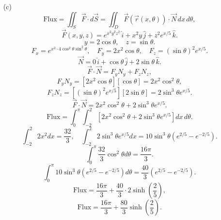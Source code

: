 \documentclass{report}
\begin{document}
{\begin{enumerate}
        \item[(c)]
        \[
        \text{Flux} = \iint_S \vec{F} \cdot d\vec{S} = \iint_D \vec{F}(\vec{r}(x, \theta)) \cdot \vec{N} \, dx \, d\theta,
        \]
        \[
        \vec{F}(x, y, z) = e^{x^2 y^2 z^2}\,\hat{i} + x^2 y\,\hat{j} + z^2 e^{x/5}\,\hat{k}.
        \]
        \[
        y = 2\cos \theta, \quad z = \sin \theta.
        \]
        \[
        F_x = e^{x^2 \cdot 4\cos^2 \theta \sin^2 \theta}, \quad F_y = 2x^2 \cos \theta, \quad F_z = (\sin \theta)^2 e^{x/5}.
        \]
        \[
        \vec{N} = 0\,\hat{i} + \cos \theta\,\hat{j} + 2\sin \theta\,\hat{k}.
        \]
        \[
        \vec{F} \cdot \vec{N} = F_y N_y + F_z N_z,
        \]
        \[
        F_y N_y = [2x^2 \cos \theta][\cos \theta] = 2x^2 \cos^2 \theta,
        \]
        \[
        F_z N_z = [(\sin \theta)^2 e^{x/5}][2\sin \theta] = 2\sin^3 \theta e^{x/5}.
        \]
        \[
        \vec{F} \cdot \vec{N} = 2x^2 \cos^2 \theta + 2\sin^3 \theta e^{x/5}.
        \]
        \[
        \text{Flux} = \int_{0}^{\pi} \int_{-2}^{2} \left[ 2x^2 \cos^2 \theta + 2\sin^3 \theta e^{x/5} \right] dx\, d\theta.
        \]
        \[
        \int_{-2}^{2} 2x^2 dx = \frac{32}{3}, \quad \int_{-2}^{2} 2\sin^3 \theta e^{x/5} dx = 10\sin^3 \theta \left(e^{2/5} - e^{-2/5}\right).
        \]
        \[
        \int_{0}^{\pi} \frac{32}{3} \cos^2 \theta d\theta = \frac{16\pi}{3}.
        \]
        \[
        \int_{0}^{\pi} 10\sin^3 \theta \left(e^{2/5} - e^{-2/5}\right) d\theta = \frac{40}{3} \left(e^{2/5} - e^{-2/5}\right).
        \]
        \[
        \text{Flux} = \frac{16\pi}{3} + \frac{40}{3} \cdot 2 \sinh\left(\frac{2}{5}\right),
        \]
        \[
        \text{Flux} = \frac{16\pi}{3} + \frac{80}{3} \sinh\left(\frac{2}{5}\right).
        \]
    \end{enumerate}
}
\end{document}
